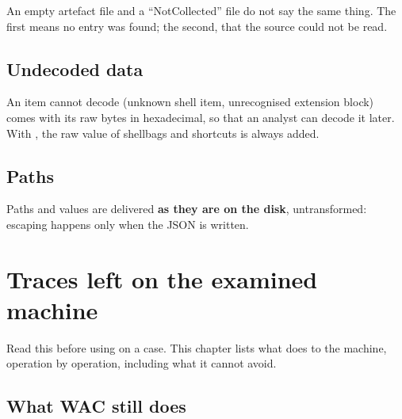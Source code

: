 \documentclass[11pt,a4paper,oneside]{report}
\begin{document}
\begin{attention}
An empty artefact file and a ``NotCollected'' file do not say the same thing.
The first means no entry was found; the second, that the source could not be
read.
\end{attention}

\section{Undecoded data}

An item \wac{} cannot decode (unknown shell item, unrecognised extension block)
comes with its raw bytes in hexadecimal, so that an analyst can decode it later.
With , the raw value of shellbags and shortcuts is always added.

\section{Paths}

Paths and values are delivered \textbf{as they are on the disk}, untransformed:
escaping happens only when the JSON is written.

\chapter{Traces left on the examined machine}\label{chap:traces}

Read this before using \wac{} on a case. This chapter lists what \wac{} does to
the machine, operation by operation, including what it cannot avoid.

\section{What WAC still does}
\end{document}
